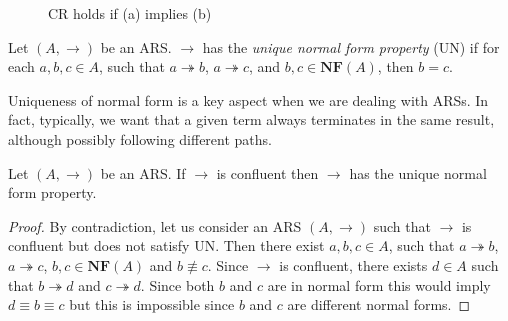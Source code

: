 \begin{figure}
	\caption{CR holds if (a) implies (b)}
	\label{figure:confluence}
\end{figure}
\begin{definition}
	Let $(A,\rightarrow)$ be an ARS. $\rightarrow$ has the \emph{unique normal form property} (UN) if for each $a,b,c\in A$, such that $a\twoheadrightarrow b$, $a\twoheadrightarrow c$, and $b,c\in\mathbf{NF}(A)$, then $b= c$.
\end{definition}
Uniqueness of normal form is a key aspect when we are dealing with ARSs. In fact, typically, we want that a given term always terminates in the same result, although possibly following different paths.
\begin{proposition}
	Let $(A,\rightarrow)$ be an ARS. If $\rightarrow$ is confluent then $\rightarrow$ has the unique normal form property.
\end{proposition}
\begin{proof}
	By contradiction, let us consider an ARS $(A,\rightarrow)$ such that $\rightarrow$ is confluent but does not satisfy UN. Then there exist $a,b,c\in A$, such that $a\twoheadrightarrow b$, $a\twoheadrightarrow c$, $b,c\in\mathbf{NF}(A)$ and $b\not\equiv c$. Since $\rightarrow$ is confluent, there exists $d\in A$ such that $b\twoheadrightarrow d$ and $c\twoheadrightarrow d$. Since both $b$ and $c$ are in normal form this would imply $d\equiv b\equiv c$ but this is impossible since $b$ and $c$ are different normal forms.
\end{proof}
